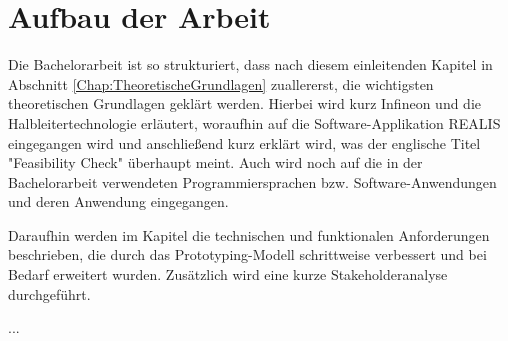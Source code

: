 \section{Aufbau der Arbeit}
Die Bachelorarbeit ist so strukturiert, dass nach diesem einleitenden Kapitel in Abschnitt \ref{Chap:TheoretischeGrundlagen} zuallererst, die wichtigsten theoretischen Grundlagen geklärt werden. 
Hierbei wird kurz Infineon und die Halbleitertechnologie erläutert, woraufhin auf die Software-Applikation \ac{REALIS} eingegangen wird und anschließend kurz erklärt wird, was der englische Titel "Feasibility Check" überhaupt meint. Auch wird noch auf die in der Bachelorarbeit verwendeten Programmiersprachen bzw. Software-Anwendungen und deren Anwendung eingegangen.

Daraufhin werden im Kapitel  die technischen und funktionalen Anforderungen beschrieben, die durch das Prototyping-Modell schrittweise verbessert und bei Bedarf erweitert wurden. Zusätzlich wird eine kurze Stakeholderanalyse durchgeführt.

...